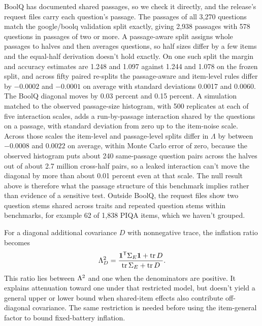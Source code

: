 BoolQ has documented shared passages, so we check it directly, and the release's request files carry each question's passage. The passages of all 3,270 questions match the google/boolq validation split exactly, giving 2,938 passages with 578 questions in passages of two or more. A passage-aware split assigns whole passages to halves and then averages questions, so half sizes differ by a few items and the equal-half derivation doesn't hold exactly. On one such split the margin and accuracy estimates are 1.248 and 1.097 against 1.244 and 1.078 on the frozen split, and across fifty paired re-splits the passage-aware and item-level rules differ by $-0.0002$ and $-0.0001$ on average with standard deviations 0.0017 and 0.0060. The BoolQ diagonal moves by 0.03 percent and 0.15 percent. A simulation matched to the observed passage-size histogram, with 500 replicates at each of five interaction scales, adds a run-by-passage interaction shared by the questions on a passage, with standard deviation from zero up to the item-noise scale. Across those scales the item-level and passage-level splits differ in $\Lambda$ by between $-0.0008$ and $0.0022$ on average, within Monte Carlo error of zero, because the observed histogram puts about 240 same-passage question pairs across the halves out of about 2.7 million cross-half pairs, so a leaked interaction can't move the diagonal by more than about 0.01 percent even at that scale. The null result above is therefore what the passage structure of this benchmark implies rather than evidence of a sensitive test. Outside BoolQ, the request files show two question stems shared across traits and repeated question stems within benchmarks, for example 62 of 1,838 PIQA items, which we haven't grouped.

For a diagonal additional covariance $D$ with nonnegative trace, the inflation ratio becomes
\begin{equation}
\Lambda_D^2=\frac{\mathbf1^{\mathsf T}\Sigma_E\mathbf1+\operatorname{tr}D}
{\operatorname{tr}\Sigma_E+\operatorname{tr}D}. \end{equation}
This ratio lies between $\Lambda^2$ and one when the denominators are positive. It explains attenuation toward one under that restricted model, but doesn't yield a general upper or lower bound when shared-item effects also contribute off-diagonal covariance. The same restriction is needed before using the item-general factor to bound fixed-battery inflation.

